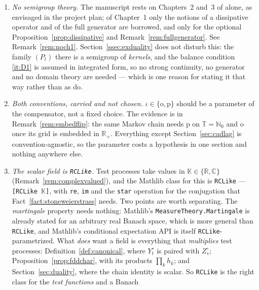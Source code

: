 \documentclass[11pt,a4paper]{article}
\theoremstyle{plain}
\theoremstyle{definition}
\theoremstyle{remark}
\newcommand{\R}{\mathbb{R}}
\newcommand{\N}{\mathbb{N}}
\newcommand{\Rp}{\R_+}
\newcommand{\T}{\mathbb{T}}                     %
\newcommand{\DGP}{\cite{DGP24}}
\newcommand{\K}{\mathbb{K}}
\newcommand{\C}{\mathbb{C}}
\newcommand{\EK}{\cite{EK86}}
\begin{document}
\begin{enumerate}[label=(\alph*)]
  interest, and within Sections~\ref{sec:cadlag} and \ref{sec:uniqueness} they are
  the only place where Polishness of $E$ is really used.  (In
  Section~\ref{sec:convergence} it is used throughout, and irreducibly: \eqref{E3}
  is what makes Prohorov's theorem available.)
\item \emph{No semigroup theory.}  The manuscript rests on Chapters~2 and~3 of
  \EK{} alone, as envisaged in the project plan; of Chapter~1 only the notions of
  a dissipative operator and of the full generator are borrowed, and only for the
  optional Proposition~\ref{prop:dissipative} and Remark~\ref{rem:fullgenerator}.
  See Remark~\ref{rem:noch1}.  Section~\ref{ssec:exduality} does not disturb
  this: the family $(P_t)$ there is a semigroup of \emph{kernels}, and the
  balance condition \ref{it:D1} is assumed in integrated form, so no strong
  continuity, no generator and no domain theory are needed --- which is one
  reason for stating it that way rather than as \DGP{} do.
\item \emph{Both conventions, carried and not chosen.}  $\iota \in \{\mathrm{o},\mathrm{p}\}$
  should be a parameter of the compensator, not a fixed choice.  The evidence is
  in Remark~\ref{rem:embedflip}: the same Markov chain needs $\mathrm{p}$ on
  $\T = \N_0$ and $\mathrm{o}$ once its grid is embedded in $\Rp$.  Everything
  except Section~\ref{sec:cadlag} is convention-agnostic, so the parameter costs a
  hypothesis in one section and nothing anywhere else.
\item \emph{The scalar field is \texttt{RCLike}.}  Test processes take values in
  $\K \in \{\R,\C\}$ (Remark~\ref{rem:complexvalued}), and the Mathlib class for
  this is \texttt{RCLike} --- \texttt{[RCLike \(\mathbb{K}\)]}, with
  \texttt{re}, \texttt{im} and the \texttt{star} operation for the conjugation
  that Fact~\ref{fact:stoneweierstrass} needs.  Two points are worth separating.
  The \emph{martingale} property needs nothing: Mathlib's
  \texttt{MeasureTheory.Martingale} is already stated for an arbitrary real
  Banach space, which is more general than \texttt{RCLike}, and Mathlib's
  conditional expectation API is itself \texttt{RCLike}-parametrized.  What
  \emph{does} want a field is everything that \emph{multiplies} test processes:
  Definition~\ref{def:canonical}, where $Y^\circ_t$ is paired with $Z^\circ_s$;
  Proposition~\ref{prop:fddchar}, with its products $\prod_k h_k$; and
  Section~\ref{sec:duality}, where the chain identity is scalar.  So
  \texttt{RCLike} is the right class for the \emph{test functions} and a Banach

\end{enumerate}
\end{document}
